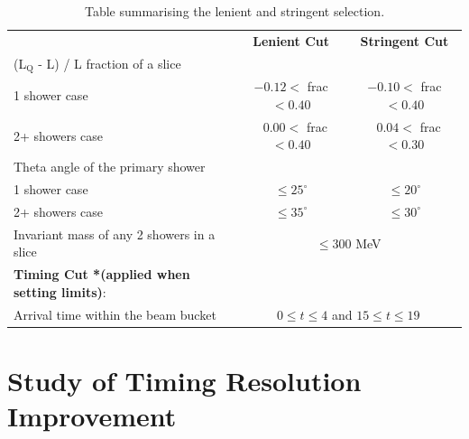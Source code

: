 \begin{table}[htbp!]
\begin{center}
\begin{tabular}{| p{7.75cm} | m{3.25cm} | m{3.25cm} |}
 \cline{2-3}
 & \multicolumn{1}{c|}{\textbf{Lenient Cut}}  & \multicolumn{1}{c|}{\textbf{Stringent Cut}} \\  
 \cline{2-3}
 (L$_\mathrm{Q}$ - L) / L fraction of a slice &  &  \\
  \hspace{0.5cm} 1 shower case & \multicolumn{1}{c|}{$-0.12 <$ frac $< 0.40$} & \multicolumn{1}{c|}{$-0.10 <$ frac $< 0.40$} \\
  \hspace{0.5cm} 2+ showers case & \multicolumn{1}{c|}{$\ \ \ 0.00 <$ frac $< 0.40$} & \multicolumn{1}{c|}{$\ \ \ 0.04 <$ frac $< 0.30$} \\ [1ex]
  Theta angle of the primary shower &  &  \\
  \hspace{0.5cm}1 shower case & \multicolumn{1}{c|}{$\leq 25^\circ$} & \multicolumn{1}{c|}{$\leq20^\circ$} \\
  \hspace{0.5cm}2+ showers case & \multicolumn{1}{c|}{$\leq 35^\circ$} & \multicolumn{1}{c|}{$\leq 30^\circ$} \\ [1ex]
  \cline{2-3} 
  Invariant mass of any 2 showers in a slice  & \multicolumn{2}{c|}{$\leq 300$ MeV} \\ [1ex]
 \hline
 \textbf{Timing Cut *(applied when setting limits)}: &  \multicolumn{2}{c|}{} \\ [1ex] 
 Arrival time within the beam bucket  & \multicolumn{2}{c|}{$0 \leq t \leq 4$ and $15 \leq t \leq 19$} \\ [1ex]
 \hline
\end{tabular}
\end{center}
\caption{Table summarising the lenient and stringent selection.}
\label{table:cut_summary}
\end{table}

\section{Study of Timing Resolution Improvement}
\label{sec:truth_bucket}

